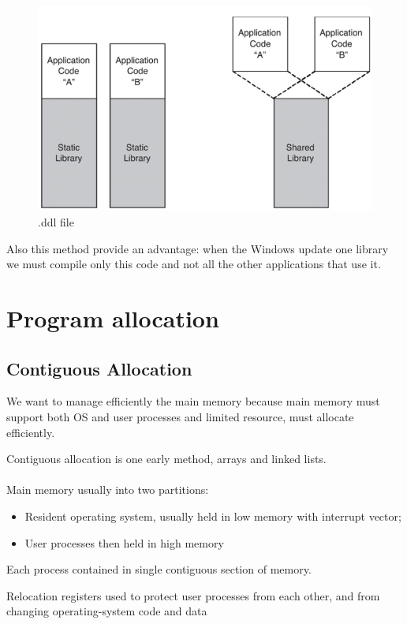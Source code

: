 \begin{figure}[htbp]
    \centering
    \includegraphics[width=0.55\linewidth]{img/ddl.png}
    \caption{.ddl file}
\end{figure}

Also this method provide an advantage: when the Windows update one library we must compile only this code and not all the other applications that use it.

\newpage
\section{Program allocation}

\subsection{Contiguous Allocation}

We want to manage efficiently the main memory because main memory must support both OS and user processes and limited resource, must allocate efficiently. 

Contiguous allocation is one early method, arrays and linked lists.

\paragraph{}

Main memory usually into two partitions:

\begin{itemize}
    \item Resident operating system, usually held in low memory with interrupt vector;
    \item User processes then held in high memory
\end{itemize}

Each process contained in single contiguous section of memory. 

Relocation registers used to protect user processes from each other, and from changing operating-system code and data

